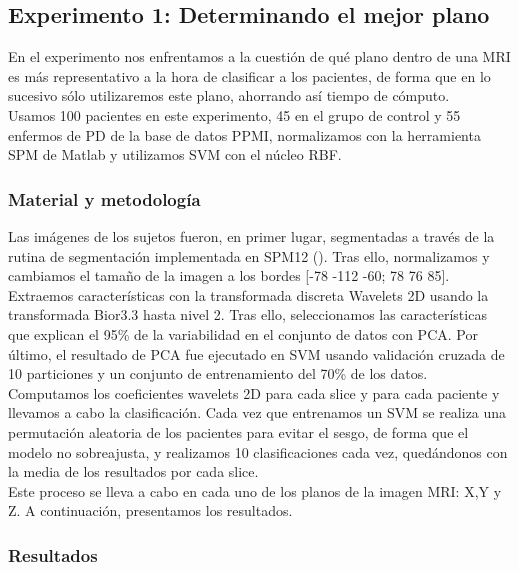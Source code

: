 \newpage

\subsection{Experimento 1: Determinando el mejor plano}

En el experimento nos enfrentamos a la cuestión de qué plano dentro de una MRI es más representativo a la hora de clasificar a los pacientes, de forma que en lo sucesivo sólo utilizaremos este plano, ahorrando así tiempo de cómputo. \\

Usamos 100 pacientes en este experimento, 45 en el grupo de control y 55 enfermos de PD de la base de datos PPMI, normalizamos con la herramienta SPM de Matlab  y utilizamos SVM con el núcleo RBF.

\subsubsection{Material y metodología}

Las imágenes de los sujetos fueron, en primer lugar, segmentadas a través de la rutina de segmentación implementada en SPM12 (\cite{spm}). Tras ello, normalizamos y cambiamos el tamaño de la imagen a los bordes [-78 -112 -60; 78 76 85]. Extraemos características con la transformada discreta Wavelets 2D usando la transformada Bior3.3 hasta nivel 2. Tras ello, seleccionamos las características que explican el 95\% de la variabilidad en el conjunto de datos con PCA. Por último, el resultado de PCA fue ejecutado en SVM usando validación cruzada de 10 particiones y un conjunto de entrenamiento del 70\% de los datos. \\

Computamos los coeficientes wavelets 2D para cada slice y para cada paciente y llevamos a cabo la clasificación. Cada vez que entrenamos un SVM se realiza una permutación aleatoria de los pacientes para evitar el sesgo, de forma que el modelo no sobreajusta, y realizamos 10 clasificaciones cada vez, quedándonos con la media de los resultados por cada slice. \\

Este proceso se lleva a cabo en cada uno de los planos de la imagen MRI: X,Y y Z. A continuación, presentamos los resultados.

\subsubsection{Resultados}

